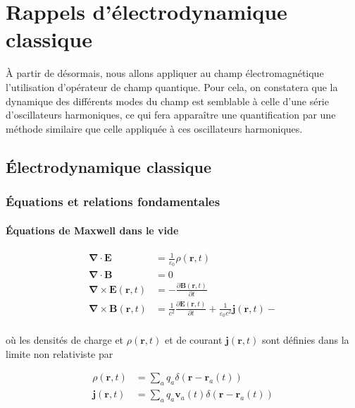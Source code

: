 \section{Rappels d’électrodynamique classique}

    À partir de désormais, nous allons appliquer au champ électromagnétique l’utilisation d’opérateur de champ quantique. Pour cela, on constatera que la dynamique des différents modes du champ est semblable à celle d’une série d’oscillateurs harmoniques, ce qui fera apparaître une quantification par une méthode similaire que celle appliquée à ces oscillateurs harmoniques.

    \subsection{Électrodynamique classique}

        \subsubsection{Équations et relations fondamentales}

        \paragraph{Équations de Maxwell dans le vide} 

        \begin{align*}
            \symbf{\nabla} \cdot \mathbf{E} &= \frac{1}{\varepsilon_0} \rho(\mathbf{r},t) \\
            \symbf{\nabla} \cdot \mathbf{B} &= 0 \\
            \symbf{\nabla} \times \mathbf{E}(\mathbf{r},t) &= - \frac{\partial \mathbf{B}(\mathbf{r},t)}{\partial t} \\
            \symbf{\nabla} \times \mathbf{B}(\mathbf{r},t) &= \frac{1}{c^2} \frac{\partial \mathbf{E}(\mathbf{r},t)}{\partial t} +  \frac{1}{\varepsilon_0 c^2} \mathbf{j}(\mathbf{r},t) -  \\
        \end{align*}

        où les densités de charge et $\rho(\mathbf{r},t)$ et de courant $\mathbf{j}(\mathbf{r},t)$ sont définies dans la limite non relativiste par 
        
        \begin{align*}
            \rho(\mathbf{r},t) &= \sum_{a} q_a \delta(\mathbf{r} - \mathbf{r}_a(t)) \\
            \mathbf{j}(\mathbf{r},t) &= \sum_{a} q_a \mathbf{v}_a(t) \delta(\mathbf{r} - \mathbf{r}_a(t)) \\
        \end{align*}

